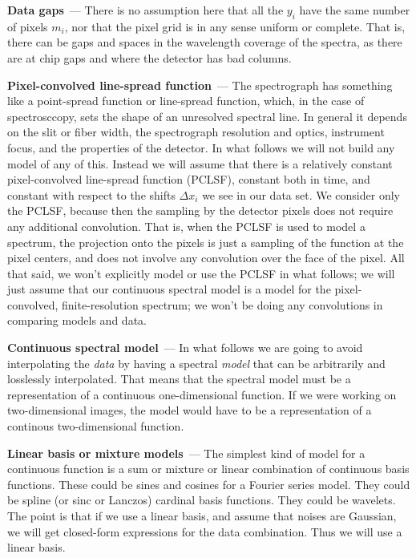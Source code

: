 \documentclass[11pt]{article}
\renewcommand{\paragraph}[1]{\medskip\par\noindent\textbf{#1}~---}
\begin{document}
\paragraph{Data gaps}
There is no assumption here that all the $y_i$ have the same number of pixels $m_i$, nor that the pixel grid is in any sense uniform or complete.
That is, there can be gaps and spaces in the wavelength coverage of the spectra, as there are at chip gaps and where the detector has bad columns.

\paragraph{Pixel-convolved line-spread function}
The spectrograph has something like a point-spread function or line-spread function, which, in the case of spectrosccopy, sets the shape of an unresolved spectral line.
In general it depends on the slit or fiber width, the spectrograph resolution and optics, instrument focus, and the properties of the detector.
In what follows we will not build any model of any of this.
Instead we will assume that there is a relatively constant pixel-convolved line-spread function (PCLSF), constant both in time, and constant with respect to the shifts $\Delta x_i$ we see in our data set.
We consider only the PCLSF, because then the sampling by the detector pixels does not require any additional convolution.
That is, when the PCLSF is used to model a spectrum, the projection onto the pixels is just a sampling of the function at the pixel centers, and does not involve any convolution over the face of the pixel.
All that said, we won't explicitly model or use the PCLSF in what follows; we will just assume that our continuous spectral model is a model for the pixel-convolved, finite-resolution spectrum; we won't be doing any convolutions in comparing models and data.

\paragraph{Continuous spectral model}
In what follows we are going to avoid interpolating the \emph{data} by having a spectral \emph{model} that can be arbitrarily and losslessly interpolated.
That means that the spectral model must be a representation of a continuous one-dimensional function.
If we were working on two-dimensional images, the model would have to be a representation of a continous two-dimensional function.

\paragraph{Linear basis or mixture models}
The simplest kind of model for a continuous function is a sum or mixture or linear combination of continuous basis functions.
These could be sines and cosines for a Fourier series model.
They could be spline (or sinc or Lanczos) cardinal basis functions.
They could be wavelets.
The point is that if we use a linear basis, and assume that noises are Gaussian, we will get closed-form expressions for the data combination.
Thus we will use a linear basis.
\end{document}
